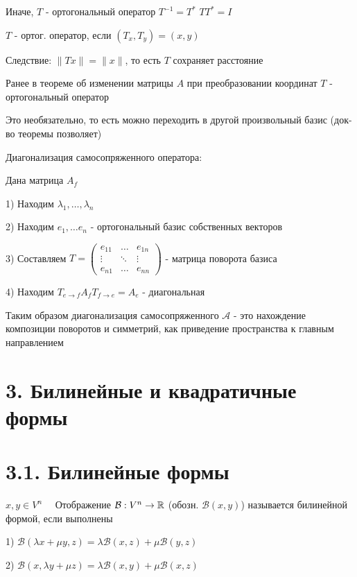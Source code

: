 \documentclass[12pt]{article}
\begin{document}
    \Nota Иначе, $T$ - ортогональный оператор \Longleftrightarrow $T^{-1} = T^*$ \Longrightarrow $T T^* = I$

    \Def $T$ - ортог. оператор, если $(T_x, T_y) = (x, y)$

    Следствие: $\|Tx\| = \|x\|$, то есть $T$ сохраняет расстояние

    \Nota Ранее в теореме об изменении матрицы $A$ при преобразовании координат $T$ - ортогональный оператор

    Это необязательно, то есть можно переходить в другой произвольный базис (док-во теоремы позволяет)

    Диагонализация самосопряженного оператора:

    Дана матрица $A_f$

    1) Находим $\lambda_1, \dots, \lambda_n$

    2) Находим $e_1, \dots e_n$ - ортогональный базис собственных векторов

    3) Составляем $T = \begin{pmatrix}e_{11} & \dots & e_{1n} \\ \vdots & \ddots & \vdots \\ e_{n1} & \dots & e_{nn}\end{pmatrix}$ - матрица поворота базиса

    4) Находим $T_{e\to f}A_f T_{f\to e} = A_e$ - диагональная

    Таким образом диагонализация самосопряженного $\mathcal{A}$ - это нахождение композиции поворотов и симметрий,
    как приведение пространства к главным направлением

    \clearpage

    \section{3. Билинейные и квадратичные формы}

    \section{3.1. Билинейные формы}

    \Def $x, y \in V^n \quad$ Отображение $\mathcal{B}: V^n \to \mathbb{R}$ (обозн. $\mathcal{B}(x, y)$)
    называется билинейной формой, если выполнены

    1) $\mathcal{B}(\lambda x + \mu y, z) = \lambda \mathcal{B}(x, z) + \mu \mathcal{B}(y, z)$

    2) $\mathcal{B}(x, \lambda y + \mu z) = \lambda \mathcal{B}(x, y) + \mu \mathcal{B}(x, z)$
\end{document}
